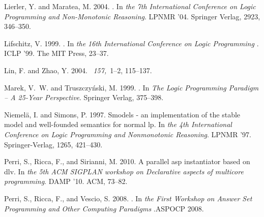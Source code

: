 \documentclass[preprint]{tlp}
\begin{document}
\begin{thebibliography}
{\sc Lierler, Y.} {\sc and} {\sc Maratea, M.} 2004.
.
\newblock In {\em {the 7th International Conference on Logic
  Programming and Non-Monotonic Reasoning}}. LPNMR '04. Springer Verlag, 2923, 346--350.

{\sc Lifschitz, V.} 1999.
.
\newblock In {\em {the 16th International Conference on Logic
  Programming }}. ICLP '99. The MIT Press, 23--37.

{\sc Lin, F.} {\sc and} {\sc Zhao, Y.} 2004.
~{\em 157,\/}~1--2, 115--137.

{\sc Marek, V.~W.} {\sc and} {\sc Truszczy{\'n}ski, M.} 1999.
.
\newblock In {\em {The Logic Programming Paradigm -- A 25-Year Perspective}}. Springer Verlag, 375--398.

{\sc Niemel\"{a}, I.} {\sc and} {\sc Simons, P.} 1997.
\newblock Smodels - an implementation of the stable model and well-founded
  semantics for normal lp.
\newblock In {\em the 4th International Conference on Logic
  Programming and Nonmonotonic Reasoning}. LPNMR '97. Springer-Verlag, 1265, 421--430.

{\sc Perri, S.}, {\sc Ricca, F.}, {\sc and} {\sc Sirianni, M.} 2010.
\newblock A parallel asp instantiator based on dlv.
\newblock In {\em the 5th ACM SIGPLAN workshop on Declarative
  aspects of multicore programming}. DAMP '10. ACM, 73--82.

{\sc Perri, S.}, {\sc Ricca, F.}, {\sc and} {\sc Vescio, S.} 2008.
.
\newblock In {\em the First Workshop on Answer Set Programming
  and Other Computing Paradigms }.ASPOCP 2008.


\end{thebibliography}
\end{document}
